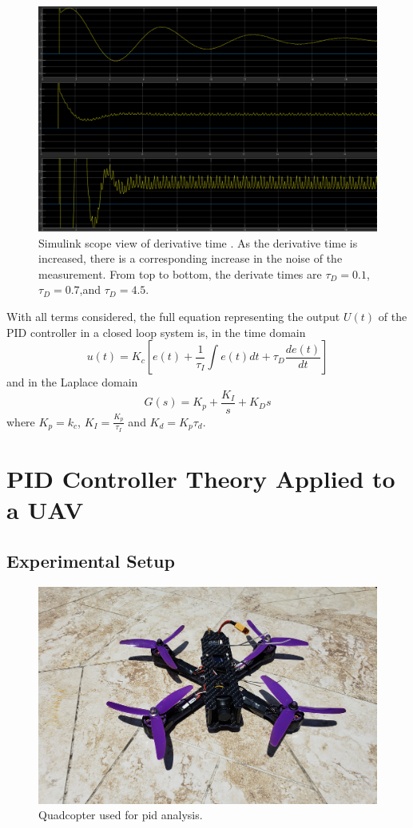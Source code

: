 \documentclass[11pt]{ucthesis}
\begin{document}
\begin{figure}[H]
	\centering
	\includegraphics[width=12cm]{tdCompare}
	\caption[Noise fluctuations of derivative time]{Simulink scope view of derivative time \cite{documentationsimulation}. As the derivative time is increased, there is a corresponding increase in the noise of the measurement. From top to bottom, the derivate times are $\tau_D=0.1$, $\tau_D=0.7$,and  $\tau_D=4.5$.}
	\label{fig:dCompare}
\end{figure}
\noindent
With all terms considered, the full equation representing the output $U(t)$ of the PID controller in a closed loop system is, in the time domain
\begin{equation}
u(t) = K_c[e(t) + \frac{1}{\tau_I} \int e(t)dt + \tau_D \frac{de(t)}{dt}]
\end{equation}
and in the Laplace domain
\begin{equation}\label{eq:laplacefunction}
G(s) = K_p +\frac{K_I}{s} + K_Ds
\end{equation}
where $K_p = k_c$, $K_I = \frac{K_p}{\tau_I}$ and $K_d = K_p  \tau_d$.
\chapter{PID Controller Theory Applied to a UAV}
\section{Experimental Setup}
\begin{figure}[H]
	\centering
	\includegraphics[width=\textwidth]{20200530_121423crop}
	\caption[Quadcopter]{Quadcopter used for pid analysis.}
	\label{fig:wizard1}
\end{figure}
\end{document}
